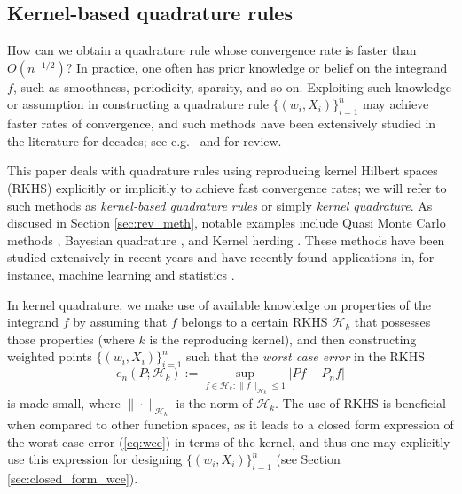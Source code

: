 \documentclass[11pt]{article}
\theoremstyle{remark}
\theoremstyle{example}
\theoremstyle{remark}
\newcommand{\cd}{\cdot}
\renewcommand{\H}{{\mathcal{H}}}
\newcommand{\R}{\mathbb{R}}
\newcommand{\citep}{\cite}
\begin{document}
\subsection{Kernel-based quadrature rules}

How can we obtain a quadrature rule whose convergence rate is faster than $O(n^{-1/2})$?
In practice, one often has prior knowledge or belief on the integrand $f$, such as smoothness, periodicity, sparsity, and so on.  Exploiting such knowledge or assumption in constructing a quadrature rule $\{ (w_i,X_i) \}_{i=1}^n$ may achieve faster rates of convergence, and such methods have been extensively studied in the literature for decades; see e.g.~\cite{DicKuoSlo13} and \cite{BriOatGirOsbSej15} for review.

This paper deals with quadrature rules using reproducing kernel Hilbert spaces (RKHS) explicitly or implicitly to achieve fast convergence rates; we will refer to such methods as {\em kernel-based quadrature rules} or simply {\em kernel quadrature}. 
As discused in Section \ref{sec:rev_meth}, notable examples include Quasi Monte Carlo methods \citep{Hic98,NovWoz10,DicKuoSlo13,DicNuyPil14}, Bayesian quadrature \citep{Oha91,BriOatGirOsbSej15}, and Kernel herding \citep{CheWelSmo10,BacJulObo12,Chen_ICML2018}. 
These methods have been studied extensively in recent years \citep{SomVia06,BriOatGirOsb15,OatGir16,OatGirCho17,Bac17,Xi_ICML2018,Karvonen_NIPS2018} and 
have recently found applications in, for instance, machine learning and statistics \citep{AvrSinYanMah16,LacLinBac15,GerCho15,BriOatGirOsbSej15,KerHen16,Oates_NIPS2017,paul_alternating_2018}. 

In kernel quadrature,  we make use of available knowledge on properties of the integrand $f$ by assuming that $f$ belongs to a certain RKHS $\H_k$ that possesses those properties (where $k$ is the reproducing kernel), 
and then constructing weighted points $\{ (w_i, X_i) \}_{i=1}^n$ such that the {\em worst case error} in the RKHS
\begin{equation} \label{eq:wce}
e_n(P;\H_k) := \sup_{f \in \H_k: \| f \|_{\H_k} \leq 1} \left| Pf - P_n f\right|
\end{equation}
is made small, where $\| \cd \|_{\H_k}$ is the norm of $\H_k$. 
The use of RKHS is beneficial when compared to other function spaces, as it leads to a closed form expression of the worst case error (\ref{eq:wce}) in terms of the kernel, and thus one may explicitly use this expression for designing $\{ (w_i, X_i) \}_{i=1}^n$  (see Section \ref{sec:closed_form_wce}). 
\end{document}
